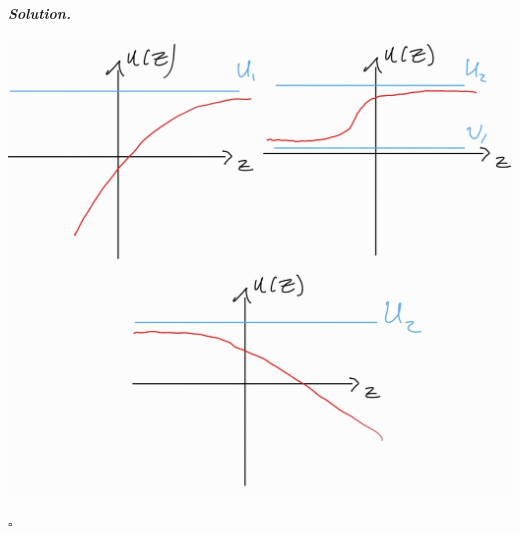 \documentclass[12pt]{report}
\newenvironment{solution}[1][\it{Solution}]{\textbf{#1. } }{$\square$}
\begin{document}
\begin{solution}
\begin{enumerate}
        \begin{center}
            \includegraphics[width=.6\textwidth]{plots/4b-set3.jpg}
        \end{center}


\end{enumerate}
\end{solution}
\end{document}
